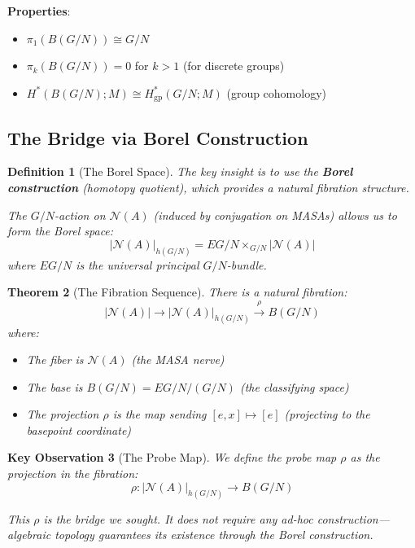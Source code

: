 \documentclass[11pt]{article}
\newtheorem{theorem}{Theorem}[section]
\newtheorem{definition}[theorem]{Definition}
\newtheorem{keyobservation}[theorem]{Key Observation}
\begin{document}
\textbf{Properties}:
\begin{itemize}
\item $\pi_1(B(G/N)) \cong G/N$
\item $\pi_k(B(G/N)) = 0$ for $k > 1$ (for discrete groups)
\item $H^*(B(G/N); M) \cong H^*_{\text{gp}}(G/N; M)$ (group cohomology)
\end{itemize}

\subsection{The Bridge via Borel Construction}
\label{borel}

\begin{definition}[The Borel Space]\label{def:borel}
The key insight is to use the \textbf{Borel construction} (homotopy quotient), which provides a natural fibration structure.

The $G/N$-action on $\mathcal{N}(A)$ (induced by conjugation on MASAs) allows us to form the Borel space:
\[
|\mathcal{N}(A)|_{h(G/N)} = EG/N \times_{G/N} |\mathcal{N}(A)|
\]
where $EG/N$ is the universal principal $G/N$-bundle.
\end{definition}

\begin{theorem}[The Fibration Sequence]\label{thm:fibration}
There is a natural fibration:
\[
|\mathcal{N}(A)| \longrightarrow |\mathcal{N}(A)|_{h(G/N)} \xrightarrow{\rho} B(G/N)
\]
where:
\begin{itemize}
\item The fiber is $\mathcal{N}(A)$ (the MASA nerve)
\item The base is $B(G/N) = EG/N / (G/N)$ (the classifying space)
\item The projection $\rho$ is the map sending $[e, x] \mapsto [e]$ (projecting to the basepoint coordinate)
\end{itemize}
\end{theorem}

\begin{keyobservation}[The Probe Map]\label{obs:probe}
We define the probe map $\rho$ as the projection in the fibration:
\[
\rho: |\mathcal{N}(A)|_{h(G/N)} \longrightarrow B(G/N)
\]

This $\rho$ is the bridge we sought. It does not require any ad-hoc construction---algebraic topology guarantees its existence through the Borel construction.
\end{keyobservation}
\end{document}
